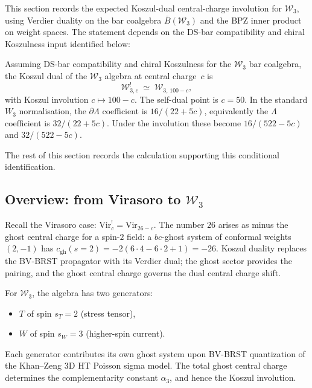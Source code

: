\documentclass[11pt]{article}
\newcommand{\cW}{\mathcal{W}}
\newcommand{\barB}{\overline{B}}
\begin{document}
This section records the expected Koszul-dual central-charge
involution for $\cW_3$, using Verdier duality on the bar coalgebra
$\barB(\cW_3)$ and the BPZ inner product on weight spaces.  The
statement depends on the DS-bar compatibility and chiral Koszulness
input identified below:

\begin{proposition}[Conditional Koszul dual of $\cW_3$]
\label{thm:koszul-dual-W3}
Assuming DS-bar compatibility and chiral Koszulness for the
$\cW_3$ bar coalgebra, the Koszul dual of the $\cW_3$ algebra at
central charge~$c$ is
\begin{equation}\label{eq:W3-koszul-dual}
\boxed{\;
\cW_{3,c}^!
\;\simeq\;
\cW_{3,\,100-c},
\;}
\end{equation}
with Koszul involution $c \mapsto 100 - c$.  The self-dual point
is $c = 50$.  In the standard $W_3$ normalisation, the
$\partial\Lambda$ coefficient is $16/(22+5c)$, equivalently the
$\Lambda$ coefficient is $32/(22+5c)$.  Under the involution these
become $16/(522-5c)$ and $32/(522-5c)$.
\end{proposition}

The rest of this section records the calculation supporting this
conditional identification.

\subsection{Overview: from Virasoro to $\cW_3$}

Recall the Virasoro case: $\mathrm{Vir}_c^! = \mathrm{Vir}_{26-c}$.
The number $26$ arises as minus the ghost central charge for a
spin-$2$ field: a $bc$-ghost system of conformal weights $(2, -1)$
has $c_{\mathrm{gh}}(s=2) = -2(6 \cdot 4 - 6 \cdot 2 + 1) = -26$.
Koszul duality replaces the BV-BRST propagator with its Verdier
dual; the ghost sector provides the pairing, and the ghost central
charge governs the dual central charge shift.

For $\cW_3$, the algebra has two generators:
\begin{itemize}
\item $T$ of spin $s_T = 2$ (stress tensor),
\item $W$ of spin $s_W = 3$ (higher-spin current).
\end{itemize}
Each generator contributes its own ghost system upon BV-BRST
quantization of the Khan--Zeng 3D HT Poisson sigma model.  The
total ghost central charge determines the complementarity
constant $\alpha_3$, and hence the Koszul involution.
\end{document}
